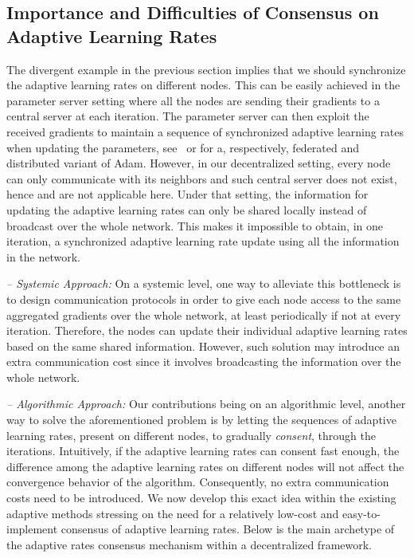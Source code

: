 \documentclass[anon,12pt]{colt2021} %
\begin{document}
\vspace{-0.05in}
\subsection{Importance and Difficulties of Consensus on Adaptive Learning Rates}
\vspace{-0.05in}

The divergent example in the previous section implies that we should synchronize the adaptive learning rates on different nodes. 
This can be easily achieved in the parameter server setting where all the nodes are sending their gradients to a central server at each iteration.
The parameter server can then exploit the received gradients to maintain a sequence of synchronized adaptive learning rates when updating the parameters, see~\cite{reddi2020adaptive} or \cite{chen2021cada} for a, respectively, federated and distributed variant of Adam.
However, in our decentralized setting, every node can only communicate with its neighbors and such central server does not exist, hence \citep{reddi2020adaptive} and \citep{chen2021cada} are not applicable here.
Under that setting, the information for updating the adaptive learning rates can only be shared locally instead of broadcast over the whole network.
This makes it impossible to obtain, in one iteration, a synchronized adaptive learning rate update using all the information in the network. 

\textit{-- Systemic Approach:} 
On a systemic level, one way to alleviate this bottleneck is to design communication protocols in order to give each node access to the same aggregated gradients over the whole network, at least periodically if not at every iteration.
Therefore, the nodes can update their individual adaptive learning rates based on the same shared information. 
However, such solution may introduce an extra communication cost since it involves broadcasting the information over the whole network.

\textit{-- Algorithmic Approach:} 
Our contributions being on an algorithmic level, another way to solve the aforementioned problem is by letting the sequences of adaptive learning rates, present on different nodes, to gradually \emph{consent}, through the iterations. 
Intuitively, if the adaptive learning rates can consent fast enough, the difference among the adaptive learning rates on different nodes will not affect the convergence behavior of the algorithm.  
Consequently, no extra communication costs need to be introduced.
We now develop this exact idea within the existing adaptive methods stressing on the need for a relatively low-cost and easy-to-implement consensus of adaptive learning rates. 
Below is the main archetype of the adaptive rates consensus mechanism within a decentralized framework.
\end{document}
